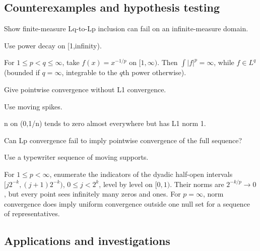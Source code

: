 \subsection*{Counterexamples and hypothesis testing}

\begin{exercise}\label{exr:iii06-expand-10}
Show finite-measure Lq-to-Lp inclusion can fail on an infinite-measure domain.
\end{exercise}
\begin{hint}
Use power decay on [1,infinity).
\end{hint}
\begin{solution}
For $1\le p<q\le\infty$, take $f(x)=x^{-1/p}$ on $[1,\infty)$. Then $\int |f|^p=\infty$, while $f\in L^q$ (bounded if $q=\infty$, integrable to the $q$th power otherwise).
\end{solution}

\begin{exercise}\label{exr:iii06-expand-11}
Give pointwise convergence without L1 convergence.
\end{exercise}
\begin{hint}
Use moving spikes.
\end{hint}
\begin{solution}
n on (0,1/n) tends to zero almost everywhere but has L1 norm 1.
\end{solution}

\begin{exercise}\label{exr:iii06-expand-12}
Can Lp convergence fail to imply pointwise convergence of the full sequence?
\end{exercise}
\begin{hint}
Use a typewriter sequence of moving supports.
\end{hint}
\begin{solution}
For $1\le p<\infty$, enumerate the indicators of the dyadic half-open intervals $[j2^{-k},(j+1)2^{-k})$, $0\le j<2^k$, level by level on $[0,1)$. Their norms are $2^{-k/p}\to0$, but every point sees infinitely many zeros and ones. For $p=\infty$, norm convergence does imply uniform convergence outside one null set for a sequence of representatives.
\end{solution}

\subsection*{Applications and investigations}

